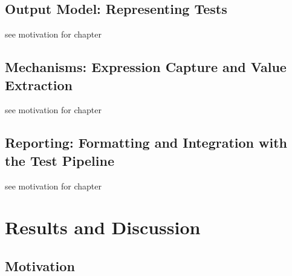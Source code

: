\documentclass[
	bibliography=totoc,
	listof=totoc,
]{scrbook}
\begin{document}
\section{Output Model: Representing Tests} %


\begin{marker}\begin{justify}
see motivation for chapter
\end{justify}\end{marker}


\section{Mechanisms: Expression Capture and Value Extraction}


\begin{marker}\begin{justify}
see motivation for chapter
\end{justify}\end{marker}


\section{Reporting: Formatting and Integration with the Test Pipeline}


\begin{marker}\begin{justify}
see motivation for chapter
\end{justify}\end{marker}


\pagebreak %
\chapter{Results and Discussion} %
\section*{Motivation} %
\end{document}
